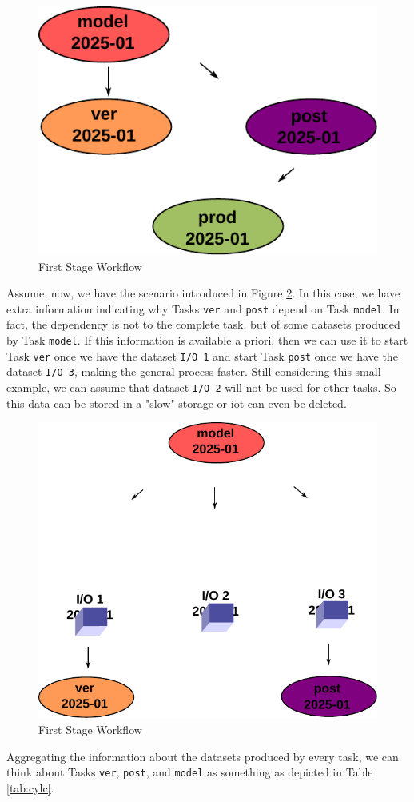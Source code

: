 \documentclass[a4paper]{article}
\begin{document}
\begin{figure}[H]
  \centering
  \includegraphics[width=0.4\columnwidth]{cylc-1}
  \caption{First Stage Workflow}
  \label{fig:cylc-1}
\end{figure}

Assume, now, we have the scenario introduced in Figure \ref{fig:cylc-io-model-2}. In this case, we have extra information indicating why Tasks \texttt{ver} and \texttt{post} depend on Task \texttt{model}. In fact, the dependency is not to the complete task, but of some datasets produced by Task \texttt{model}. If this information is available a priori, then we can use it to start Task \texttt{ver} once we have the dataset \texttt{I/O 1} and start Task \texttt{post} once we have the dataset \texttt{I/O 3}, making the general process faster. Still considering this small example, we can assume that dataset \texttt{I/O 2} will not be used for other tasks. So this data can be stored in a "slow" storage or iot can even be deleted.

\begin{figure}[H]
  \centering
  \includegraphics[width=0.6\columnwidth]{cylc-io-model-2}
  \caption{First Stage Workflow}
  \label{fig:cylc-io-model-2}
\end{figure}

Aggregating the information about the datasets produced by every task, we can think about Tasks \texttt{ver}, \texttt{post}, and \texttt{model} as something as depicted in Table \ref{tab:cylc}.
\end{document}

